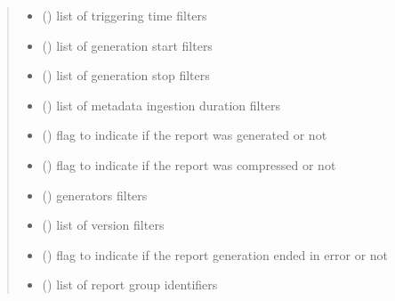 \begin{fulllineitems}
\begin{fulllineitems}
\begin{quote}
\begin{description}
\begin{itemize}
\item {} 
 () \textendash{} list of triggering time filters

\item {} 
 () \textendash{} list of generation start filters

\item {} 
 () \textendash{} list of generation stop filters

\item {} 
 () \textendash{} list of metadata ingestion duration filters

\item {} 
 () \textendash{} flag to indicate if the report was generated or not

\item {} 
 () \textendash{} flag to indicate if the report was compressed or not

\item {} 
 () \textendash{} generators filters

\item {} 
 () \textendash{} list of version filters

\item {} 
 () \textendash{} flag to indicate if the report generation ended in error or not

\item {} 
 () \textendash{} list of report group identifiers


\end{itemize}
\end{description}
\end{quote}
\end{fulllineitems}
\end{fulllineitems}
